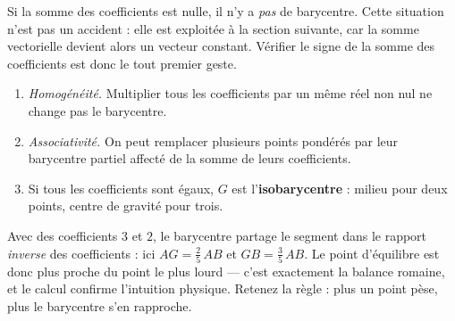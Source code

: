 \begin{avertissement}
Si la somme des coefficients est nulle, il n'y a \emph{pas} de barycentre.
Cette situation n'est pas un accident : elle est exploitée à la section
suivante, car la somme vectorielle devient alors un vecteur constant. Vérifier
le signe de la somme des coefficients est donc le tout premier geste.
\end{avertissement}

\begin{propriete}
\begin{enumerate}[label=\textbf{\arabic*.}, leftmargin=*, itemsep=0.15em]
  \item \emph{Homogénéité.} Multiplier tous les coefficients par un même réel
        non nul ne change pas le barycentre.
  \item \emph{Associativité.} On peut remplacer plusieurs points pondérés par
        leur barycentre partiel affecté de la somme de leurs coefficients.
  \item Si tous les coefficients sont égaux, $G$ est l'\textbf{isobarycentre} :
        milieu pour deux points, centre de gravité pour trois.
\end{enumerate}
\end{propriete}

\begin{visualisation}
\begin{center}
\end{center}

Avec des coefficients $3$ et $2$, le barycentre partage le segment dans le
rapport \emph{inverse} des coefficients : ici $AG = \frac25\,AB$ et
$GB = \frac35\,AB$. Le point d'équilibre est donc plus proche du point le plus
lourd — c'est exactement la balance romaine, et le calcul confirme l'intuition
physique. Retenez la règle : plus un point pèse, plus le barycentre s'en
rapproche.
\end{visualisation}

